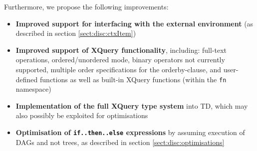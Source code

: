 Furthermore, we propose the following improvements:
\begin{itemize}
  \item \textbf{Improved support for interfacing with the external environment} (as
  described in section \ref{sect:disc:ctxItem})
  \item \textbf{Improved support of XQuery functionality}, including: full-text
  operations, ordered/unordered mode, binary operators not currently supported,
  multiple order specifications for the orderby-clause, and user-defined
  functions as well as built-in XQuery functions (within the \texttt{fn} namespace)
  \item \textbf{Implementation of the full XQuery type system} into TD, which may also
  possibly be exploited for optimisations
  \item \textbf{Optimisation of \texttt{if..then..else} expressions} by assuming
  execution of DAGs and not trees, as described in section
  \ref{sect:disc:optimisations}
\end{itemize}